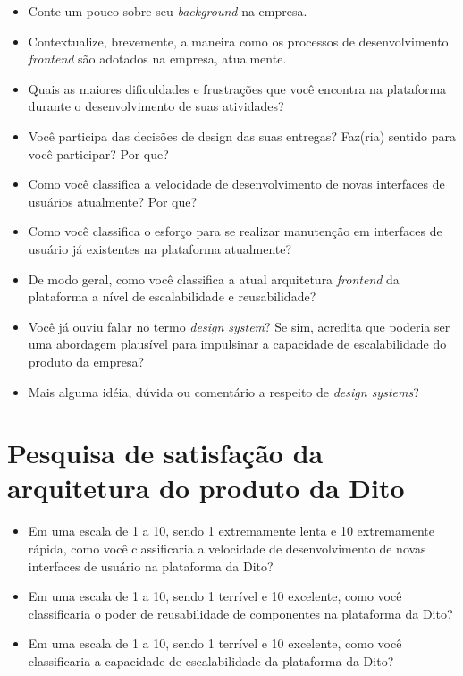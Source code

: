 \begin{anexosenv}
\begin{itemize}
  \item Conte um pouco sobre seu \textit{background} na empresa.
  \item Contextualize, brevemente, a maneira como os processos de desenvolvimento \textit{frontend} são adotados na empresa, atualmente.
  \item Quais as maiores dificuldades e frustrações que você encontra na plataforma durante o desenvolvimento de suas atividades?
  \item Você participa das decisões de design das suas entregas? Faz(ria) sentido para você participar? Por que?
  \item Como você classifica a velocidade de desenvolvimento de novas interfaces de usuários atualmente? Por que?
  \item Como você classifica o esforço para se realizar manutenção em interfaces de usuário já existentes na plataforma atualmente?
  \item De modo geral, como você classifica a atual arquitetura \textit{frontend} da plataforma a nível de escalabilidade e reusabilidade?
  \item Você já ouviu falar no termo \textit{design system}? Se sim, acredita que poderia ser uma abordagem plausível para impulsinar a capacidade de escalabilidade do produto da empresa?
  \item Mais alguma idéia, dúvida ou comentário a respeito de \textit{design systems}?
\end{itemize}


\chapter{Pesquisa de satisfação da arquitetura do produto da Dito}
\label{chap:anexoC}

\begin{itemize}
	\item Em uma escala de 1 a 10, sendo 1 extremamente lenta e 10 extremamente rápida, como você classificaria a velocidade de desenvolvimento de novas interfaces de usuário na plataforma da Dito?
	\item Em uma escala de 1 a 10, sendo 1 terrível e 10 excelente, como você classificaria o poder de reusabilidade de componentes na plataforma da Dito?
	\item Em uma escala de 1 a 10, sendo 1 terrível e 10 excelente, como você classificaria a capacidade de escalabilidade da plataforma da Dito?
\end{itemize}

\end{anexosenv}
